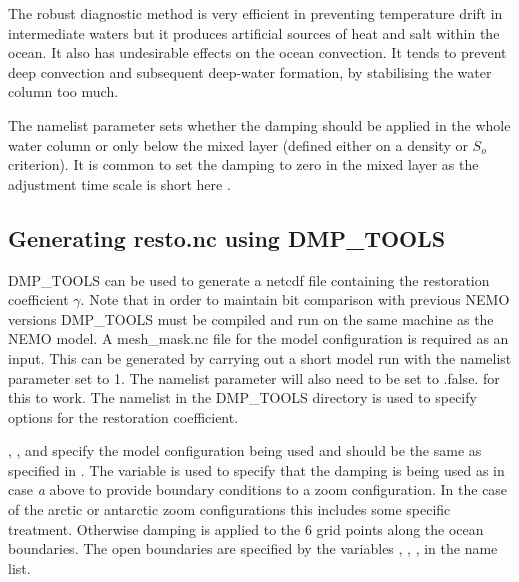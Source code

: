 \documentclass[NEMO_book]{subfiles}
\begin{document}
The robust diagnostic method is very efficient in preventing temperature 
drift in intermediate waters but it produces artificial sources of heat and salt 
within the ocean. It also has undesirable effects on the ocean convection. 
It tends to prevent deep convection and subsequent deep-water formation, 
by stabilising the water column too much.

The namelist parameter  sets whether the damping should be applied in the whole water column or only below the mixed layer (defined either on a density or $S_o$ criterion). It is common to set the damping to zero in the mixed layer as the adjustment time scale is short here \citep{Madec_al_JPO96}.

\subsection[DMP\_TOOLS]{Generating resto.nc using DMP\_TOOLS}

DMP\_TOOLS can be used to generate a netcdf file containing the restoration coefficient $\gamma$. 
Note that in order to maintain bit comparison with previous NEMO versions DMP\_TOOLS must be compiled 
and run on the same machine as the NEMO model. A mesh\_mask.nc file for the model configuration is required as an input. 
This can be generated by carrying out a short model run with the namelist parameter  set to 1. 
The namelist parameter  will also need to be set to .false. for this to work. 
The  namelist in the DMP\_TOOLS directory is used to specify options for the restoration coefficient.


, ,  and  specify the model configuration being used and should be the same as specified in . The variable  is used to specify that the damping is being used as in case \textit{a} above to provide boundary conditions to a zoom configuration. In the case of the arctic or antarctic zoom configurations this includes some specific treatment. Otherwise damping is applied to the 6 grid points along the ocean boundaries. The open boundaries are specified by the variables , , ,  in the  name list.
\end{document}
